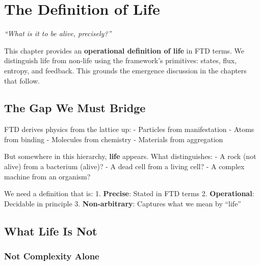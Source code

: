 \documentclass[
  11pt,
  letterpaper,
  twoside,
  openright]{book}
\begin{document}
\chapter{The Definition of Life}\label{sec-definition-life}

\emph{``What is it to be alive, precisely?''}

\begin{tcolorbox}[enhanced jigsaw, coltitle=black, colbacktitle=quarto-callout-note-color!10!white, toprule=.15mm, colframe=quarto-callout-note-color-frame, arc=.35mm, opacityback=0, bottomtitle=1mm, toptitle=1mm, breakable, colback=white, titlerule=0mm, opacitybacktitle=0.6, title=\textcolor{quarto-callout-note-color}{\faInfo}\hspace{0.5em}{Purpose of This Chapter}, rightrule=.15mm, bottomrule=.15mm, leftrule=.75mm, left=2mm]

This chapter provides an \textbf{operational definition of life} in FTD
terms. We distinguish life from non-life using the framework's
primitives: states, flux, entropy, and feedback. This grounds the
emergence discussion in the chapters that follow.

\end{tcolorbox}

\section{The Gap We Must Bridge}\label{the-gap-we-must-bridge}

FTD derives physics from the lattice up: - Particles from manifestation
- Atoms from binding - Molecules from chemistry - Materials from
aggregation

But somewhere in this hierarchy, \textbf{life} appears. What
distinguishes: - A rock (not alive) from a bacterium (alive)? - A dead
cell from a living cell? - A complex machine from an organism?

We need a definition that is: 1. \textbf{Precise}: Stated in FTD terms
2. \textbf{Operational}: Decidable in principle 3.
\textbf{Non-arbitrary}: Captures what we mean by ``life''

\section{What Life Is Not}\label{what-life-is-not}

\subsection{Not Complexity Alone}\label{not-complexity-alone}
\end{document}
